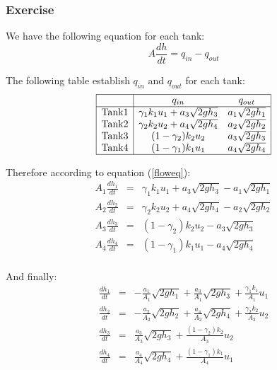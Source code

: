 \subsubsection{Exercise} 

We have the following equation for each tank:
\begin{equation}
A \frac{dh}{dt} = q_{in} - q_{out} 
\label{floweq}
\end{equation}

The following table establish $q_{in}$ and $q_{out}$ for each tank:
$$
\begin{array}{|c|cc|}
    \hline
    & q_{in} & q_{out} \\
    \hline
    \text{Tank} 1 & \gamma_1k_1u_1+a_3\sqrt{2gh_3} & a_1\sqrt{2gh_1} \\
    \text{Tank} 2 & \gamma_2k_2u_2+a_4\sqrt{2gh_4} & a_2\sqrt{2gh_2} \\
    \text{Tank} 3 & (1-\gamma_2)k_2u_2 & a_3\sqrt{2gh_3} \\ 
    \text{Tank} 4 & (1-\gamma_1)k_1u_1 & a_4\sqrt{2gh_4} \\ 
    \hline
\end{array}
$$

Therefore according to equation (\ref{floweq}): 
$$
    \begin{array}{rcl}
    A_1 \frac{dh_1}{dt} & = &
        \gamma_1k_1u_1+a_3\sqrt{2gh_3} - a_1\sqrt{2gh_1} \\
    A_2 \frac{dh_2}{dt} & = &
        \gamma_2k_2u_2+a_4\sqrt{2gh_4} - a_2\sqrt{2gh_2} \\
    A_3 \frac{dh_3}{dt} & = &
        (1-\gamma_2)k_2u_2 - a_3\sqrt{2gh_3} \\ 
    A_4 \frac{dh_4}{dt} & = &
    (1-\gamma_1)k_1u_1 - a_4\sqrt{2gh_4} \\ 
    \end{array}
$$

And finally:
\begin{equation}
    \boxed{
        \begin{array}{rcl}
    \frac{dh_1}{dt} & = &
            - \frac{a_1}{A_1}\sqrt{2gh_1} + \frac{a_3}{A_1}\sqrt{2gh_3} + \frac{\gamma_1k_1}{A_1}u_1\\ 

    \frac{dh_2}{dt} & = &
            - \frac{a_2}{A_2}\sqrt{2gh_2} + \frac{a_4}{A_2}\sqrt{2gh_4} + \frac{\gamma_2k_2}{A_2}u_2\\ 

    \frac{dh_3}{dt} & = &
            \frac{a_3}{A_3}\sqrt{2gh_3}+\frac{(1-\gamma_2)k_2}{A_3}u_2 \\ 

    \frac{dh_4}{dt} & = &
            \frac{a_4}{A_4}\sqrt{2gh_4}+\frac{(1-\gamma_1)k_1}{A_4}u_1 \\ 
        \end{array}
    \label{tanksyseq}
}
\end{equation}
